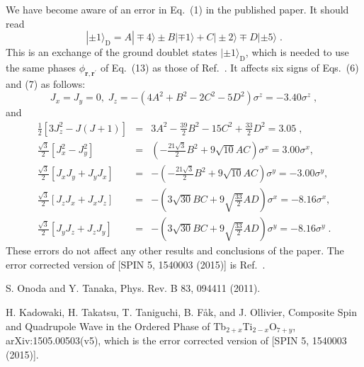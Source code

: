 \documentclass[%
 reprint,
 amsmath,amssymb,
 aps,
]{revtex4-2}
\begin{document}
\begin{widetext}
%

We have become aware of an error in Eq.~(1) in the published paper. 
It should read 
%
\begin{equation}
| \pm 1 \rangle_{\text{D}} 
= A | \mp 4 \rangle \pm B | \mp 1 \rangle + C | \pm 2 \rangle \mp D | \pm 5 \rangle \nonumber \; .
\label{G_doublet}
\end{equation}
%
This is an exchange of the ground doublet states $| \pm 1 \rangle_{\text{D}}$, 
which is needed to use the same phases $\phi_{\bm{r},\bm{r}^{\prime}}$ of Eq.~(13) as 
those of Ref.~\cite{Onoda2011}. 
It affects six signs of Eqs.~(6) and (7) as follows: 
%
\begin{equation}
J_x = J_y = 0 , \; J_z = - (4A^2+B^2-2C^2-5D^2) \sigma^z = - 3.40 \sigma^z \nonumber \; ,
\label{mag}
\end{equation}
%
and
%
\begin{eqnarray}
\tfrac{1}{2}[ 3 J_z^2 -J(J+1)] &=& 
3A^2 - \tfrac{39}{2} B^2 - 15 C^2 + \tfrac{33}{2} D^2 = 3.05 \; ,\nonumber\\
%
\tfrac{\sqrt{3}}{2}[ J_x^2 - J_y^2] &=& 
\left( -\tfrac{21 \sqrt{3}}{2} B^2 + 9 \sqrt{10} AC \right) \sigma^x =  3.00 \sigma^x ,\nonumber\\
\tfrac{\sqrt{3}}{2}[ J_x J_y + J_y J_x ] &=& 
- \left( -\tfrac{21 \sqrt{3}}{2} B^2 + 9 \sqrt{10} AC \right) \sigma^y =  - 3.00 \sigma^y ,\nonumber\\
\tfrac{\sqrt{3}}{2}[ J_z J_x + J_x J_z ] &=& 
- \left( 3 \sqrt{30} BC + 9 \sqrt{\tfrac{33}{2}} AD \right) \sigma^x =  -8.16 \sigma^x ,\nonumber\\
\tfrac{\sqrt{3}}{2}[ J_y J_z + J_z J_y ] &=& 
- \left( 3 \sqrt{30} BC + 9 \sqrt{\tfrac{33}{2}} AD \right) \sigma^y =  - 8.16 \sigma^y \nonumber \; .
\label{quad2}
\end{eqnarray}
%
These errors do not affect any other results and conclusions of the paper. 
The error corrected version of [SPIN 5, 1540003 (2015)] is Ref.~\cite{kado2021}.

%

\begin{thebibliography}{9}
S. Onoda and Y. Tanaka, Phys. Rev. B 83, 094411 (2011).

H. Kadowaki, H. Takatsu, T. Taniguchi, B. F{\aa}k, and J. Ollivier, 
Composite Spin and Quadrupole Wave in the Ordered Phase of Tb$_{2+x}$Ti$_{2-x}$O$_{7+y}$, 
arXiv:1505.00503(v5), which is 
the error corrected version of [SPIN 5, 1540003 (2015)].

\end{thebibliography}

\end{widetext}

%
\end{document}
